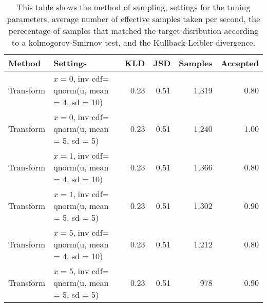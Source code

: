 \begin{table}[h]
\centering
\begin{tabular}{llrrrr}
  \hline
Method & Settings & KLD & JSD & Samples & Accepted \\ 
  \hline
Transform & $x = 0 $,$\text{inv cdf} =$  qnorm(u, mean = 4, sd = 10) & 0.23 & 0.51 & 1,319 & 0.80 \\ 
  Transform & $x = 0 $,$\text{inv cdf} =$  qnorm(u, mean = 5, sd = 5) & 0.23 & 0.51 & 1,240 & 1.00 \\ 
  Transform & $x = 1 $,$\text{inv cdf} =$  qnorm(u, mean = 4, sd = 10) & 0.23 & 0.51 & 1,366 & 0.80 \\ 
  Transform & $x = 1 $,$\text{inv cdf} =$  qnorm(u, mean = 5, sd = 5) & 0.23 & 0.51 & 1,302 & 0.90 \\ 
  Transform & $x = 5 $,$\text{inv cdf} =$  qnorm(u, mean = 4, sd = 10) & 0.23 & 0.51 & 1,212 & 0.80 \\ 
  Transform & $x = 5 $,$\text{inv cdf} =$  qnorm(u, mean = 5, sd = 5) & 0.23 & 0.51 & 978 & 0.90 \\ 
   \hline
\end{tabular}
\caption{This table shows the method of sampling, settings for the tuning parameters, average number of effective samples taken per second, the perecentage of samples that matched the target disribution according to a kolmogorov-Smirnov test, and the Kullback-Leibler divergence.} 
\end{table}

